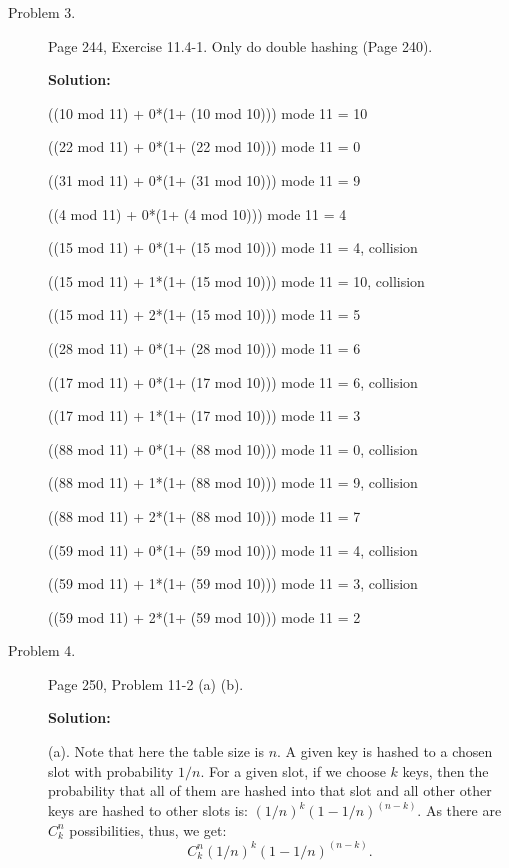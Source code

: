 \documentclass[11pt]{article}
\begin{document}
\begin{description}
\begin{comment}
\end{comment}

\item[Problem 3.]
Page 244, Exercise 11.4-1. Only do double hashing (Page 240).


\noindent \textbf{Solution:}

((10 mod 11) + 0*(1+ (10 mod 10))) mode 11 = 10

((22 mod 11) + 0*(1+ (22 mod 10))) mode 11 = 0

((31 mod 11) + 0*(1+ (31 mod 10))) mode 11 = 9

((4 mod 11) + 0*(1+ (4 mod 10))) mode 11 = 4

((15 mod 11) + 0*(1+ (15 mod 10))) mode 11 = 4, collision

((15 mod 11) + 1*(1+ (15 mod 10))) mode 11 = 10, collision

((15 mod 11) + 2*(1+ (15 mod 10))) mode 11 = 5

((28 mod 11) + 0*(1+ (28 mod 10))) mode 11 = 6

((17 mod 11) + 0*(1+ (17 mod 10))) mode 11 = 6, collision

((17 mod 11) + 1*(1+ (17 mod 10))) mode 11 = 3

((88 mod 11) + 0*(1+ (88 mod 10))) mode 11 = 0, collision

((88 mod 11) + 1*(1+ (88 mod 10))) mode 11 = 9, collision

((88 mod 11) + 2*(1+ (88 mod 10))) mode 11 = 7

((59 mod 11) + 0*(1+ (59 mod 10))) mode 11 = 4, collision

((59 mod 11) + 1*(1+ (59 mod 10))) mode 11 = 3, collision

((59 mod 11) + 2*(1+ (59 mod 10))) mode 11 = 2






\item[Problem 4.]
Page 250, Problem 11-2 (a) (b).


\noindent \textbf{Solution:}

(a). Note that here the table size is $n$. A given key is hashed to a chosen
slot with probability $1/n$. For a given slot, if we choose $k$ keys, then the
probability that all of them are hashed into that slot and all other other keys
are hashed to other slots is: $(1/n)^k(1-1/n)^{(n-k)}$. As there are
$C^{n}_{k}$ possibilities, thus, we get:
$$
C^{n}_{k} (1/n)^k(1-1/n)^{(n-k)}.
$$



\end{description}
\end{document}
